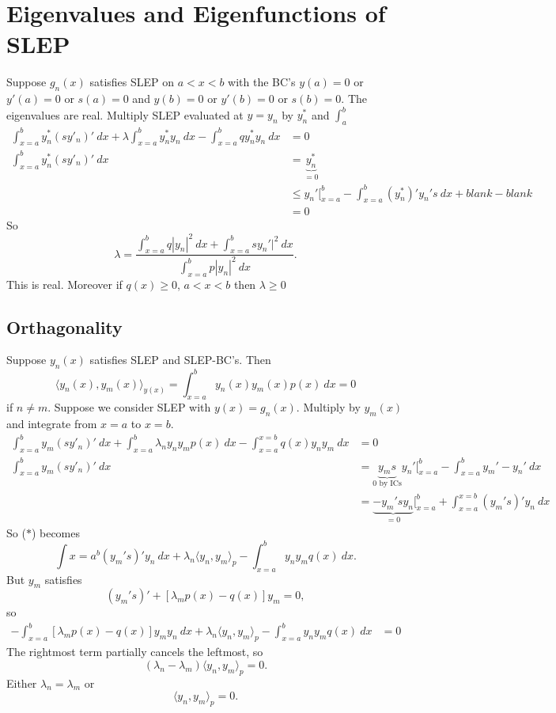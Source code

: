 \documentclass[cm]{article}
\begin{document}
\section{Eigenvalues and Eigenfunctions of SLEP}
Suppose $g_n(x)$ satisfies SLEP on $a < x < b$ with the BC's
$y(a) = 0$ or $y'(a) = 0$ or $s(a) = 0$
and
$y(b) = 0$ or $y'(b) = 0$ or $s(b) = 0$.
\thm
The eigenvalues are real.
\xthm
\prf
Multiply SLEP evaluated at $y = y_n$ by $y_n^\ast$ and $\int_a^b$
\begin{align*}
\int_{x=a}^b y_n^\ast(sy'_n)'~dx + \lambda \int_{x=a}^b y_n^\ast y_n~dx -
\int_{x=a}^b qy_n^\ast y_n~dx &= 0\\
\int_{x=a}^b y_n^\ast(sy'_n)'~dx  &= \underbrace{y_n^\ast}_{=0} \\
    &\leq y_n' \Big[_{x=a}^b - \int_{x=a}^b(y_n^\ast)'y_n's~dx+ blank - blank \\
    &= 0
\end{align*}
So
$$ \lambda = \frac{ \int_{x=a}^b q|y_n|^2~dx + \int_{x=a}^b sy_n'|^2~dx}
{\int_{x= a}^{b}p |y_n|^2~dx}.$$
This is real. Moreover if $q(x) \geq 0$, $a < x < b$ then $\lambda \geq 0$
\xprf
\subsection{Orthagonality}
\thm
Suppose $y_n(x)$ satisfies SLEP and SLEP-BC's. Then
$$\langle y_n(x), y_m(x) \rangle_{y(x)} = \int_{x=a}^b y_n(x) y_m(x)p(x)~dx = 0$$
if $n \neq m$.
\xthm
\prf
Suppose we consider SLEP with $y(x) = g_n(x)$. Multiply by $y_m(x)$ and
integrate from $x = a$ to $x = b$.
\begin{align*}
\int_{x=a}^b y_m(sy'_n)'~dx + \int_{x=a}^b \lambda_n y_n y_m p(x)~dx - \int_{x=a}^{x=b} q(x) y_n y_m~dx &= 0 \\
\int_{x=a}^b y_m(sy'_n)'~dx &= \underbrace{y_m s}_{0 \text{ by ICs}} y_n' \Big[_{x=a}^b - \int_{x=a}^{b} y_m' - y_n'~dx \\
   &= \underbrace{-y_m'sy_n}_{=0} \Big[_{x=a}^b + \int_{x=a}^{x=b} (y_m's)'y_n~dx
\end{align*}
So ($\ast$) becomes
$$\int{x=a}^b (y_m's)' y_n~dx + \lambda_n \langle y_n, y_m \rangle_p -
\int_{x=a}^by_ny_mq(x)~dx.$$
But $y_m$ satisfies
$$(y_m's)' + [\lambda_m p(x) - q(x)]y_m = 0,$$
so
\begin{align*}
- \int_{x=a}^b[\lambda_m p(x) - q(x)]y_my_n~dx + \lambda_n \langle y_n, y_m
    \rangle_p - \int_{x =a}^b y_ny_m q(x)~dx &= 0
\end{align*}
The rightmost term partially cancels the leftmost, so
$$(\lambda_n - \lambda_m) \langle y_n, y_m \rangle_p = 0.$$
Either $\lambda_n = \lambda_m$ or
$$\langle y_n, y_m \rangle_p = 0.$$
\smiley
\xprf
\end{document}
